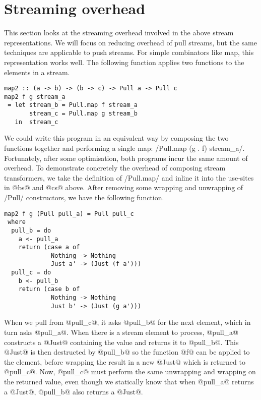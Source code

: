 \section{Streaming overhead}

This section looks at the streaming overhead involved in the above stream representations.
We will focus on reducing overhead of pull streams, but the same techniques are applicable to push streams.
For simple combinators like map, this representation works well.
The following function applies two functions to the elements in a stream.

\begin{lstlisting}
map2 :: (a -> b) -> (b -> c) -> Pull a -> Pull c
map2 f g stream_a
 = let stream_b = Pull.map f stream_a
       stream_c = Pull.map g stream_b
   in  stream_c
\end{lstlisting}

We could write this program in an equivalent way by composing the two functions together and performing a single map: \Hs/Pull.map (g . f) stream_a/.
Fortunately, after some optimisation, both programs incur the same amount of overhead.
To demonstrate concretely the overhead of composing stream transformers, we take the definition of \Hs/Pull.map/ and inline it into the use-sites in @bs@ and @cs@ above.
After removing some wrapping and unwrapping of \Hs/Pull/ constructors, we have the following function.

\begin{lstlisting}
map2 f g (Pull pull_a) = Pull pull_c
 where
  pull_b = do
    a <- pull_a
    return (case a of
             Nothing -> Nothing
             Just a' -> (Just (f a')))
  pull_c = do
    b <- pull_b
    return (case b of
             Nothing -> Nothing
             Just b' -> (Just (g a')))
\end{lstlisting}

When we pull from @pull_c@, it asks @pull_b@ for the next element, which in turn asks @pull_a@.
When there is a stream element to process, @pull_a@ constructs a @Just@ containing the value and returns it to @pull_b@.
This @Just@ is then destructed by @pull_b@ so the function @f@ can be applied to the element, before wrapping the result in a new @Just@ which is returned to @pull_c@.
Now, @pull_c@ must perform the same unwrapping and wrapping on the returned value, even though we statically know that when @pull_a@ returns a @Just@, @pull_b@ also returns a @Just@.

